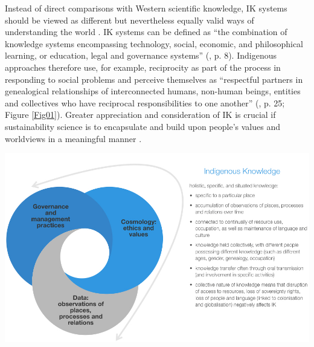 \documentclass[10pt,a4paper]{article}
\begin{document}
\begin{multicols}{2}
Instead of direct comparisons with Western scientific knowledge, IK systems should be viewed as different but nevertheless equally valid ways of understanding the world \citep{r12}. IK systems can be defined as ``the combination of knowledge systems encompassing technology, social, economic, and philosophical learning, or education, legal and governance systems'' (\citep{r13}, p. 8). Indigenous approaches therefore use, for example, reciprocity as part of the process in responding to social problems and perceive themselves as ``respectful partners in genealogical relationships of interconnected humans, non-human beings, entities and collectives who have reciprocal responsibilities to one another'' (\citep{r14}, p. 25; Figure \ref{Fig01}). Greater appreciation and consideration of IK is crucial if sustainability science is to encapsulate and build upon people’s values and worldviews in a meaningful manner \citep{r02, r15, r16}.


\end{multicols}

\vspace{2\baselineskip}


\noindent
\begin{minipage}{\columnwidth}
\centering
\resizebox{\columnwidth}{!}
{\includegraphics[width=\textwidth]{Fig01.jpeg}}
\end{minipage}

\clearpage
\end{document}
